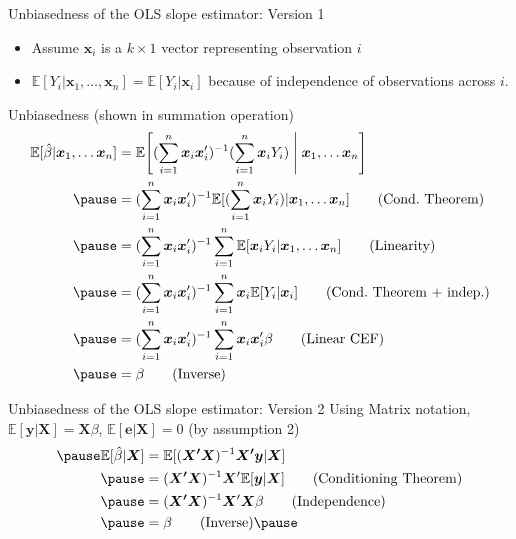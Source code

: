 \documentclass[aspectratio=169, handout]{beamer}
\numberwithin{equation}{section}
\begin{document}
\begin{frame}{Unbiasedness of the OLS slope estimator: Version 1}
\begin{itemize}
\item Assume $\bm{x}_i$ is a $k\times 1$ vector representing observation $i$\\
\item $\mathbb{E}[Y_i|\bm{x}_1,\ldots, \bm{x}_n]=\mathbb{E}[Y_i|\bm{x}_i]$ because of independence of observations across $i$.
\end{itemize}
\end{frame}

\begin{frame}{Unbiasedness (shown in summation operation)}
\vspace{-0.5em}
\footnotesize
\begin{align*}
\mathbb{E}[\hat{\beta}|\bm{x}_1,\ldots \bm{x}_n]&=\mathbb{E}\!\left[(\sum_{i=1}^n\bm{x}_i\bm{x}_i')^{-1}(\sum_{i=1}^n\bm{x}_iY_i)\;\middle|\;\bm{x}_1,\ldots \bm{x}_n\right]\\\pause
&=(\sum_{i=1}^n\bm{x}_i\bm{x}_i')^{-1}\mathbb{E}[(\sum_{i=1}^n\bm{x}_iY_i)|\bm{x}_1,\ldots \bm{x}_n] \tag{Cond.\ Theorem}\\ \pause
&=(\sum_{i=1}^n\bm{x}_i\bm{x}_i')^{-1}\sum_{i=1}^n \mathbb{E}[\bm{x}_iY_i|\bm{x}_1,\ldots \bm{x}_n] \tag{Linearity}\\ \pause
&=(\sum_{i=1}^n\bm{x}_i\bm{x}_i')^{-1}\sum_{i=1}^n \bm{x}_i\mathbb{E}[Y_i|\bm{x}_i] \tag{Cond.\ Theorem + indep.}\\ \pause
&=(\sum_{i=1}^n\bm{x}_i\bm{x}_i')^{-1}\sum_{i=1}^n \bm{x}_i\bm{x}_i'\beta \tag{Linear CEF}\\ \pause
&=\beta \tag{Inverse}\\
\end{align*}
\end{frame}

\begin{frame}{Unbiasedness of the OLS slope estimator: Version 2}
Using Matrix notation, $\mathbb{E}[\bm{y}|\bm{X}]=\bm{X}\beta$,  $\mathbb{E}[\bm{e}|\bm{X}]=0$ (by assumption 2)
\begin{align*} \pause
\mathbb{E}[\hat{\beta}|\bm{X}]&=\mathbb{E}[(\bm{X'X})^{-1}\bm{X'y}|\bm{X}]\\ \pause
&=(\bm{X'X})^{-1}\bm{X}'\mathbb{E}[\bm{y}|\bm{X}] \tag{Conditioning Theorem}\\ \pause
&=(\bm{X'X})^{-1}\bm{X}'\bm{X}\beta \tag{Independence}\\ \pause
&=\beta \tag{Inverse} \pause
\end{align*}
\end{frame}
\end{document}
